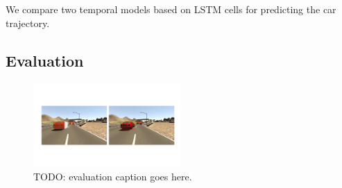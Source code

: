 \documentclass[10pt,twocolumn,letterpaper]{article}
\begin{document}
We compare two temporal models based on LSTM cells for predicting the car trajectory.



\subsection{Evaluation}
\begin{figure}[t]
        \centering
        \includegraphics[width=0.5\textwidth]{figures/evaluation.pdf}
        \caption{ {\small TODO: evaluation caption goes here.}}
        \label{fig:evaluation}
\end{figure}
\end{document}
